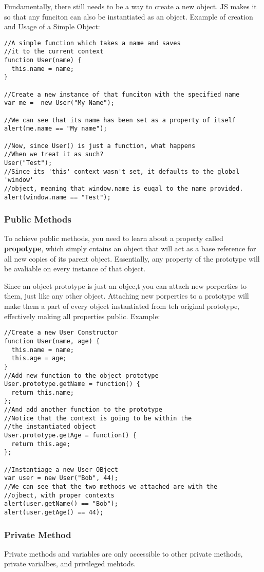 \documentclass[a4paper,11pt]{book}
\begin{document}
Fundamentally, there still needs to be a way to create a new object.  JS makes
it so that any funciton can also be instantiated as an object. Example of
creation and Usage of a Simple Object:
\begin{verbatim}
//A simple function which takes a name and saves
//it to the current context
function User(name) {
  this.name = name;
}

//Create a new instance of that funciton with the specified name
var me =  new User("My Name");

//We can see that its name has been set as a property of itself
alert(me.name == "My name");

//Now, since User() is just a function, what happens 
//When we treat it as such?
User("Test");
//Since its 'this' context wasn't set, it defaults to the global 'window'
//object, meaning that window.name is euqal to the name provided.
alert(window.name == "Test");
\end{verbatim}
\subsubsection{Public Methods}
To achieve public methods, you need to learn about a property called
\textbf{propotype}, which simply cntains an object that will act as a base
reference for all new copies of its parent object. Essentially, any property of
the prototype will be avaliable on every instance of that object.

Since an object prototype is just an objec,t you can attach new porperties to
them, just like any other object. Attaching new porperties to a prototype will
make them a part of every object instantiated from teh original prototype,
effectively making all properties public. Example:
\begin{verbatim}
//Create a new User Constructor
function User(name, age) {
  this.name = name;
  this.age = age;
}
//Add new function to the object prototype
User.prototype.getName = function() {
  return this.name;
};
//And add another function to the prototype
//Notice that the context is going to be within the 
//the instantiated object
User.prototype.getAge = function() {
  return this.age;
};

//Instantiage a new User OBject
var user = new User("Bob", 44);
//We can see that the two methods we attached are with the
//ojbect, with proper contexts
alert(user.getName() == "Bob");
alert(user.getAge() == 44);
\end{verbatim}
\subsubsection{Private Method}
Private methods and variables are only accessible to other private methods,
private varialbes, and privileged mehtods. 
\end{document}

